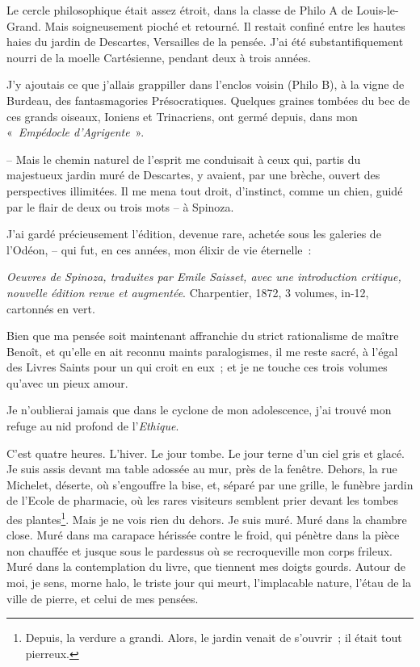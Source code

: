 Le cercle philosophique était assez étroit, dans la classe de Philo A de
Louis-le-Grand. Mais soigneusement pioché et retourné. Il restait
confiné entre les hautes haies du jardin de Descartes, Versailles de la
pensée. J'ai été substantifiquement nourri de la moelle Cartésienne,
pendant deux à trois années.

J'y ajoutais ce que j'allais grappiller dans l'enclos voisin (Philo B),
à la vigne de Burdeau, des fantasmagories Présocratiques. Quelques
graines tombées du bec de ces grands oiseaux, Ioniens et Trinacriens,
ont germé depuis, dans mon «~\emph{Empédocle d'Agrigente}~».

-- Mais le chemin naturel de l'esprit me conduisait à ceux qui, partis
du majestueux jardin muré de Descartes, y avaient, par une brèche,
ouvert des perspectives illimitées. Il me mena tout droit, d'instinct,
comme un chien, guidé par le flair de deux ou trois mots -- à Spinoza.

J'ai gardé précieusement l'édition, devenue rare, achetée sous les
galeries de l'Odéon, -- qui fut, en ces années, mon élixir de vie
éternelle~:

\emph{Oeuvres de Spinoza, traduites par Emile Saisset, avec une
introduction critique, nouvelle édition revue et augmentée}.
Charpentier, 1872, 3 volumes, in-12, cartonnés en vert.

Bien que ma pensée soit maintenant affranchie du strict rationalisme de
maître Benoît, et qu'elle en ait reconnu maints paralogismes, il me
reste sacré, à l'égal des Livres Saints pour un qui croit en eux~; et je
ne touche ces trois volumes qu'avec un pieux amour.

Je n'oublierai jamais que dans le cyclone de mon adolescence, j'ai
trouvé mon refuge au nid profond de l'\emph{Ethique}.

C'est quatre heures. L'hiver. Le jour tombe. Le jour terne d'un ciel
gris et glacé. Je suis assis devant ma table adossée au mur, près de la
fenêtre. Dehors, la rue Michelet, déserte, où s'engouffre la bise, et,
séparé par une grille, le funèbre jardin de l'Ecole de pharmacie, où les
rares visiteurs semblent prier devant les tombes des plantes\footnote{Depuis,
  la verdure a grandi. Alors, le jardin venait de s'ouvrir~; il était
  tout pierreux.}. Mais je ne vois rien du dehors. Je suis muré. Muré
dans la chambre close. Muré dans ma carapace hérissée contre le froid,
qui pénètre dans la pièce non chauffée et jusque sous le pardessus où se
recroqueville mon corps frileux. Muré dans la contemplation du livre,
que tiennent mes doigts gourds. Autour de moi, je sens, morne halo, le
triste jour qui meurt, l'implacable nature, l'étau de la ville de
pierre, et celui de mes pensées.

